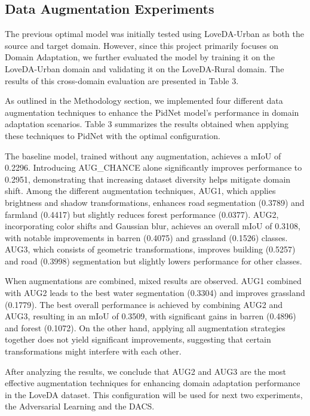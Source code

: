 \documentclass[10pt,twocolumn,letterpaper]{article}
\begin{document}
\subsection{Data Augmentation Experiments}

The previous optimal model was initially tested using LoveDA-Urban as both the source and target domain. However, since this project primarily focuses on Domain Adaptation, we further evaluated the model by training it on the LoveDA-Urban domain and validating it on the LoveDA-Rural domain. The results of this cross-domain evaluation are presented in Table 3.

As outlined in the Methodology section, we implemented four different data augmentation techniques to enhance the PidNet model’s performance in domain adaptation scenarios. Table 3 summarizes the results obtained when applying these techniques to PidNet with the optimal configuration.

The baseline model, trained without any augmentation, achieves a mIoU of 0.2296. Introducing AUG\_CHANCE alone significantly improves performance to 0.2951, demonstrating that increasing dataset diversity helps mitigate domain shift. Among the different augmentation techniques, AUG1, which applies brightness and shadow transformations, enhances road segmentation (0.3789) and farmland (0.4417) but slightly reduces forest performance (0.0377). AUG2, incorporating color shifts and Gaussian blur, achieves an overall mIoU of 0.3108, with notable improvements in barren (0.4075) and grassland (0.1526) classes. AUG3, which consists of geometric transformations, improves building (0.5257) and road (0.3998) segmentation but slightly lowers performance for other classes. 

When augmentations are combined, mixed results are observed. AUG1 combined with AUG2 leads to the best water segmentation (0.3304) and improves grassland (0.1779). The best overall performance is achieved by combining AUG2 and AUG3, resulting in an mIoU of 0.3509, with significant gains in barren (0.4896) and forest (0.1072). On the other hand, applying all augmentation strategies together does not yield significant improvements, suggesting that certain transformations might interfere with each other. 

After analyzing the results, we conclude that AUG2 and AUG3 are the most effective augmentation techniques for enhancing domain adaptation performance in the LoveDA dataset. This configuration will be used for next two experiments, the Adversarial Learning and the DACS.
\end{document}
